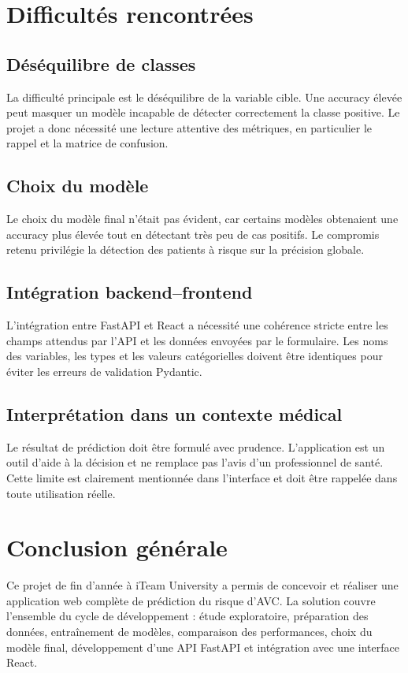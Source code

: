 \documentclass[12pt,a4paper]{report}
\newcommand{\institution}{iTeam University}
\begin{document}
\section{Difficultés rencontrées}

\subsection{Déséquilibre de classes}
La difficulté principale est le déséquilibre de la variable cible. Une accuracy élevée peut masquer un modèle incapable de détecter correctement la classe positive. Le projet a donc nécessité une lecture attentive des métriques, en particulier le rappel et la matrice de confusion.

\subsection{Choix du modèle}
Le choix du modèle final n'était pas évident, car certains modèles obtenaient une accuracy plus élevée tout en détectant très peu de cas positifs. Le compromis retenu privilégie la détection des patients à risque sur la précision globale.

\subsection{Intégration backend--frontend}
L'intégration entre FastAPI et React a nécessité une cohérence stricte entre les champs attendus par l'API et les données envoyées par le formulaire. Les noms des variables, les types et les valeurs catégorielles doivent être identiques pour éviter les erreurs de validation Pydantic.

\subsection{Interprétation dans un contexte médical}
Le résultat de prédiction doit être formulé avec prudence. L'application est un outil d'aide à la décision et ne remplace pas l'avis d'un professionnel de santé. Cette limite est clairement mentionnée dans l'interface et doit être rappelée dans toute utilisation réelle.

\section{Conclusion générale}
Ce projet de fin d'année à \institution{} a permis de concevoir et réaliser une application web complète de prédiction du risque d'AVC. La solution couvre l'ensemble du cycle de développement : étude exploratoire, préparation des données, entraînement de modèles, comparaison des performances, choix du modèle final, développement d'une API FastAPI et intégration avec une interface React.
\end{document}
